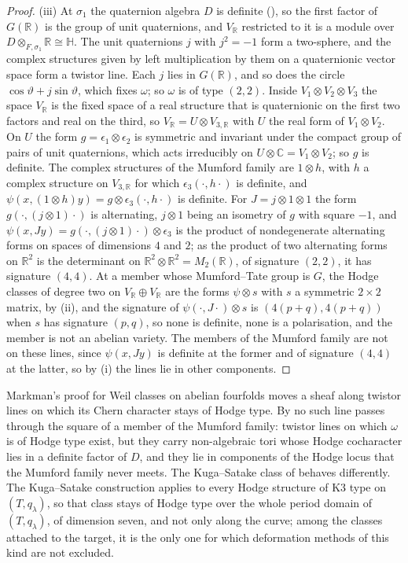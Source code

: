 \documentclass[11pt,reqno]{amsart}
\theoremstyle{plain}
\theoremstyle{definition}
\theoremstyle{remark}
\newcommand{\RR}{\mathbb{R}}
\newcommand{\CC}{\mathbb{C}}
\begin{document}
\begin{proof}
(iii) At $\sigma_{1}$ the quaternion algebra $D$ is definite
(), so the first factor of $G(\RR)$ is the group of unit
quaternions, and $V_{\RR}$ restricted to it is a module over
$D\otimes_{F,\sigma_{1}}\RR\cong\mathbb{H}$. The unit quaternions $j$ with
$j^{2}=-1$ form a two-sphere, and the complex structures given by left
multiplication by them on a quaternionic vector space form a twistor line.
Each $j$ lies in $G(\RR)$, and so does the circle $\cos\vartheta+j\sin\vartheta$,
which fixes $\omega$; so $\omega$ is of type $(2,2)$. Inside
$V_{1}\otimes V_{2}\otimes V_{3}$ the space $V_{\RR}$ is the fixed space of a
real structure that is quaternionic on the first two factors and real on the
third, so $V_{\RR}=U\otimes V_{3,\RR}$ with $U$ the real form of
$V_{1}\otimes V_{2}$. On $U$ the form $g=\epsilon_{1}\otimes\epsilon_{2}$ is
symmetric and invariant under the compact group of pairs of unit quaternions,
which acts irreducibly on $U\otimes\CC=V_{1}\otimes V_{2}$; so $g$ is
definite. The complex structures of the Mumford family are $1\otimes h$, with
$h$ a complex structure on $V_{3,\RR}$ for which $\epsilon_{3}(\cdot,h\cdot)$
is definite, and $\psi(x,(1\otimes h)y)=g\otimes\epsilon_{3}(\cdot,h\cdot)$ is
definite. For $J=j\otimes1\otimes1$ the form $g(\cdot,(j\otimes1)\cdot)$ is
alternating, $j\otimes1$ being an isometry of $g$ with square $-1$, and
$\psi(x,Jy)=g(\cdot,(j\otimes1)\cdot)\otimes\epsilon_{3}$ is the product of
nondegenerate alternating forms on spaces of dimensions $4$ and $2$; as the
product of two alternating forms on $\RR^{2}$ is the determinant on
$\RR^{2}\otimes\RR^{2}=M_{2}(\RR)$, of signature $(2,2)$, it has signature
$(4,4)$. At a member whose Mumford--Tate group is $G$, the Hodge
classes of degree two on $V_{\RR}\oplus V_{\RR}$ are the forms $\psi\otimes s$
with $s$ a symmetric $2\times2$ matrix, by (ii), and
the signature of $\psi(\cdot,J\cdot)\otimes s$ is $(4(p+q),4(p+q))$ when $s$ has
signature $(p,q)$, so none is definite, none is a polarisation, and the member
is not an abelian variety. The members of the Mumford family are not on these
lines, since $\psi(x,Jy)$ is definite at the former and of signature $(4,4)$
at the latter, so by (i) the lines lie in other components.
\end{proof}

Markman's proof for Weil classes on abelian fourfolds moves a sheaf along
twistor lines on which its Chern character stays of Hodge type. By
 no such line passes through the square of a member of
the Mumford family: twistor lines on which $\omega$ is of Hodge type exist,
but they carry non-algebraic tori whose Hodge cocharacter lies in a definite
factor of $D$, and they lie in components of the Hodge locus that the Mumford
family never meets. The Kuga--Satake class of  behaves
differently. The Kuga--Satake construction applies to every Hodge structure
of K3 type on $(T,q_{\lambda})$, so that class stays of Hodge type over the
whole period domain of $(T,q_{\lambda})$, of dimension seven, and not only
along the curve; among the classes attached to the target, it is the only one
for which deformation methods of this kind are not excluded.
\end{document}
